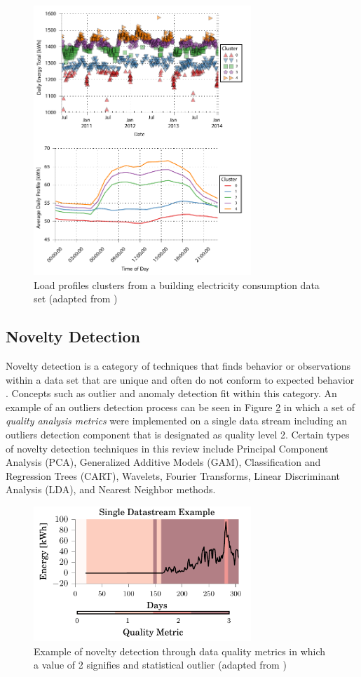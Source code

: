 \documentclass[preprint,12pt,3p]{elsarticle}
\begin{document}
\begin{figure}[H]
\centering
\includegraphics[height=4in]{./Data/combinedcluster}
\caption{Load profiles clusters from a building electricity consumption data set (adapted from \cite{miller_forensically_2015})}
\label{fig:clusteringexample}
\end{figure}

\subsection{Novelty Detection}
Novelty detection is a category of techniques that finds behavior or observations within a data set that are unique and often do not conform to expected behavior \cite{chandola_anomaly_2009}. Concepts such as outlier and anomaly detection fit within this category. An example of an outliers detection process can be seen in Figure \ref{fig:outlierdetectionexample} in which a set of \emph{quality analysis metrics} were implemented on a single data stream including an outliers detection component that is designated as quality level 2. Certain types of novelty detection techniques in this review include Principal Component Analysis (PCA), Generalized Additive Models (GAM), Classification and Regression Trees (CART), Wavelets, Fourier Transforms, Linear Discriminant Analysis (LDA), and Nearest Neighbor methods.

\begin{figure}[H]
\centering
\includegraphics[height=2in]{./Data/availability_singleplot}
\caption{Example of novelty detection through data quality metrics in which a value of 2 signifies and statistical outlier (adapted from \cite{miller_forensically_2015})}
\label{fig:outlierdetectionexample}
\end{figure}
\end{document}
